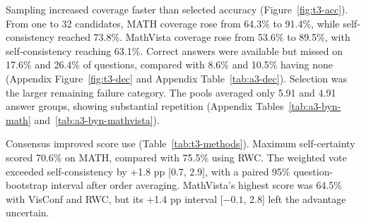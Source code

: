 \documentclass{article}
\begin{document}
\begin{table}[t]
\centering\small
\resizebox{\linewidth}{!}{}
\caption{Live generation on 50 MATH questions under a 3,072-token output allowance per strategy. Token counts and generation times are means per question. Sequential revision includes the shared initial response. Any truncation counts a capped call, while final truncation concerns the final response.}
\label{tab:t3-live}
\end{table}


\begin{table}[t]
\centering\small
\resizebox{\linewidth}{!}{}
\caption{Held-out adaptive stopping results using development-selected thresholds. Differences and paired 95\% intervals compare accuracy with fixed-32 self-consistency. Tokens and rollouts are means per question. Wrong early counts incorrect stops before 32 among all question-order runs. Fixed 32 right gives the fraction of those errors corrected by full-pool voting.}
\label{tab:t3-adaptive}
\end{table}


Sampling increased coverage faster than selected accuracy (Figure~\ref{fig:t3-acc}). From one to 32 candidates, MATH coverage rose from 64.3\% to 91.4\%, while self-consistency reached 73.8\%. MathVista coverage rose from 53.6\% to 89.5\%, with self-consistency reaching 63.1\%. Correct answers were available but missed on 17.6\% and 26.4\% of questions, compared with 8.6\% and 10.5\% having none (Appendix Figure~\ref{fig:t3-dec} and Appendix Table~\ref{tab:a3-dec}). Selection was the larger remaining failure category. The pools averaged only 5.91 and 4.91 answer groups, showing substantial repetition (Appendix Tables~\ref{tab:a3-byn-math} and~\ref{tab:a3-byn-mathvista}).

Consensus improved score use (Table~\ref{tab:t3-methods}). Maximum self-certainty scored 70.6\% on MATH, compared with 75.5\% using RWC. The weighted vote exceeded self-consistency by +1.8 pp [0.7, 2.9], with a paired 95\% question-bootstrap interval after order averaging. MathVista's highest score was 64.5\% with VisConf and RWC, but its +1.4 pp interval [$-0.1$, 2.8] left the advantage uncertain.
\end{document}
